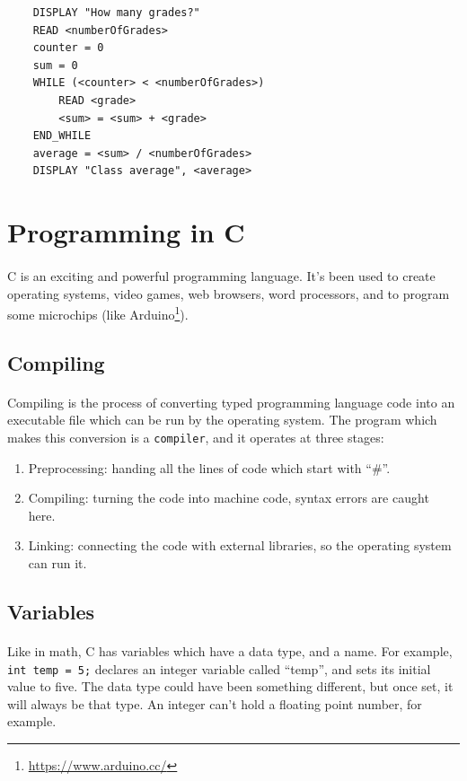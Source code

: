 \documentclass[letter,11pt]{article}
\begin{document}
\begin{verbatim}
    DISPLAY "How many grades?"
    READ <numberOfGrades>
    counter = 0
    sum = 0
    WHILE (<counter> < <numberOfGrades>)
        READ <grade>
        <sum> = <sum> + <grade>
    END_WHILE
    average = <sum> / <numberOfGrades>
    DISPLAY "Class average", <average>
\end{verbatim}

\section{Programming in C}
\paragraph{}C is an exciting and powerful programming language. It's been used to create operating systems, video games, web browsers, word processors, and to program some microchips (like Arduino\footnote{\url{https://www.arduino.cc/}}).

\subsection{Compiling}
\paragraph{}Compiling is the process of converting typed programming language code into an executable file which can be run by the operating system. The program which makes this conversion is a \texttt{compiler}, and it operates at three stages:
\begin{enumerate}
    \item Preprocessing: handing all the lines of code which start with ``\#''.
    \item Compiling: turning the code into machine code, syntax errors are caught here.
    \item Linking: connecting the code with external libraries, so the operating system can run it.
\end{enumerate}

\subsection{Variables}
\paragraph{}Like in math, C has variables which have a data type, and a name. For example, \texttt{int temp = 5;} declares an integer variable called ``temp'', and sets its initial value to five. The data type could have been something different, but once set, it will always be that type. An integer can't hold a floating point number, for example.
\end{document}
